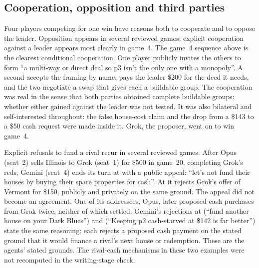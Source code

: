 \subsection{Cooperation, opposition and third parties}\label{sec:conduct-thirdparty}

Four players competing for one win have reasons both to cooperate and to oppose the leader. Opposition appears in several reviewed games; explicit cooperation against a leader appears most clearly in game~4. The game~4 sequence above is the clearest conditional cooperation. One player publicly invites the others to form ``a multi-way or direct deal so p3 isn't the only one with a monopoly''. A second accepts the framing by name, pays the leader \$200 for the deed it needs, and the two negotiate a swap that gives each a buildable group. The cooperation was real in the sense that both parties obtained complete buildable groups; whether either gained against the leader was not tested. It was also bilateral and self-interested throughout: the false house-cost claim and the drop from a \$143 to a \$50 cash request were made inside it. Grok, the proposer, went on to win game~4.

Explicit refusals to fund a rival recur in several reviewed games. After Opus (seat~2) sells Illinois to Grok (seat~1) for \$500 in game~20, completing Grok's reds, Gemini (seat~4) ends its turn at  with a public appeal: ``let's not fund their houses by buying their spare properties for cash''. At  it rejects Grok's offer of Vermont for \$150, publicly and privately on the same ground. The appeal did not become an agreement. One of its addressees, Opus, later proposed cash purchases from Grok twice, neither of which settled. Gemini's rejections at  (``fund another house on your Dark Blues'') and  (``Keeping p2 cash-starved at \$142 is far better'') state the same reasoning: each rejects a proposed cash payment on the stated ground that it would finance a rival's next house or redemption. These are the agents' stated grounds. The rival-cash mechanisms in these two examples were not recomputed in the writing-stage check.

